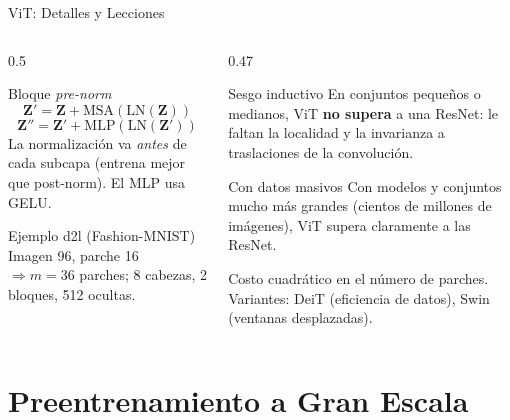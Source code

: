 \documentclass[aspectratio=169, 10pt]{beamer}
\begin{document}
\begin{frame}{ViT: Detalles y Lecciones}
	\begin{columns}[T]
		\begin{column}{0.5\textwidth}
			\begin{block}{Bloque \emph{pre-norm}}
				\small
				\[
				\mathbf{Z}'=\mathbf{Z}+\mathrm{MSA}(\mathrm{LN}(\mathbf{Z}))
				\]
				\[
				\mathbf{Z}''=\mathbf{Z}'+\mathrm{MLP}(\mathrm{LN}(\mathbf{Z}'))
				\]
				La normalizaci\'on va \emph{antes} de cada subcapa (entrena mejor que post-norm). El MLP usa GELU.
			\end{block}
			\begin{block}{Ejemplo d2l (Fashion-MNIST)}
				\small
				Imagen 96, parche 16 $\Rightarrow m=36$ parches; 8 cabezas, 2 bloques, 512 ocultas.
			\end{block}
		\end{column}
		\begin{column}{0.47\textwidth}
			\begin{alertblock}{Sesgo inductivo}
				\small
				En conjuntos peque\~nos o medianos, ViT \textbf{no supera} a una ResNet: le faltan la localidad y la invarianza a traslaciones de la convoluci\'on.
			\end{alertblock}
			\begin{block}{Con datos masivos}
				\small
				Con modelos y conjuntos mucho m\'as grandes (cientos de millones de im\'agenes), ViT supera claramente a las ResNet.
			\end{block}
			\small
			Costo cuadr\'atico en el n\'umero de parches. Variantes: DeiT (eficiencia de datos), Swin (ventanas desplazadas).
		\end{column}
	\end{columns}
\end{frame}

\section{Preentrenamiento a Gran Escala}
\end{document}
